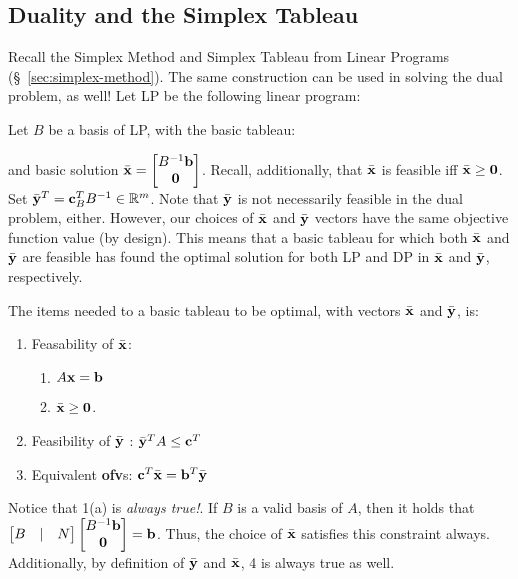 \subsection{Duality and the Simplex Tableau}

Recall the Simplex Method and Simplex Tableau from Linear Programs 
(\S~\ref{sec:simplex-method}).
The same construction can be used in solving the dual problem, as well!
Let LP be the following linear program:
Let $B$ be a basis of LP, with the basic tableau:
\begin{frml}
\end{frml}
and basic solution $\bar{\mathbf{x}} = \begin{bmatrix} 
B^{-1}\mathbf{b} \\ \mathbf{0} \end{bmatrix}$. Recall, additionally, that $\bar{\mathbf{x}}$ is feasible iff
$\bar{\mathbf{x}}\geq\mathbf{0}$. 
Set 
$\bar{\mathbf{y}}^T = \mathbf{c}_B^TB^{-1} \in \mathbb{R}^m$. Note that $\bar{\mathbf{y}}$ is not necessarily 
feasible in the dual problem, either.
However, our choices of $\bar{\mathbf{x}}$ and $\bar{\mathbf{y}}$ 
vectors have the same objective function value (by design). 
This means that a basic tableau for which both $\bar{\mathbf{x}}$ and $\bar{\mathbf{y}}$ are feasible 
has found the optimal solution for both LP and DP in $\bar{\mathbf{x}}$ and $\bar{\mathbf{y}}$, respectively.

The items needed to a basic tableau to be optimal, with vectors $\bar{\mathbf{x}}$ and $\bar{\mathbf{y}}$,
is:
\begin{enumerate}
	\item
		Feasability of $\bar{\mathbf{x}}$:
		\begin{enumerate}
			\item $A\mathbf{x} = \mathbf{b}$
			\item $\bar{\mathbf{x}} \geq \mathbf{0}$.
		\end{enumerate}
	\item Feasibility of $\bar{\mathbf{y}}$ : $\bar{\mathbf{y}}^TA \leq \mathbf{c}^T$
	\item Equivalent \textbf{ofv}s: $\mathbf{c}^T\bar{\mathbf{x}} = \mathbf{b}^T\bar{\mathbf{y}}$
\end{enumerate}

Notice that 1(a) is \textit{always true!}. If $B$ is a valid basis of $A$,
then it holds that $\begin{bmatrix}  B & | & N  \end{bmatrix} \begin{bmatrix} B^{-1}\mathbf{b} \\ \mathbf{0} \end{bmatrix}
= \mathbf{b}$. Thus, the choice of $\bar{\mathbf{x}}$ satisfies this constraint always.
Additionally, by definition of $\bar{\mathbf{y}}$ and $\bar{\mathbf{x}}$, 4 is always true as
well.

